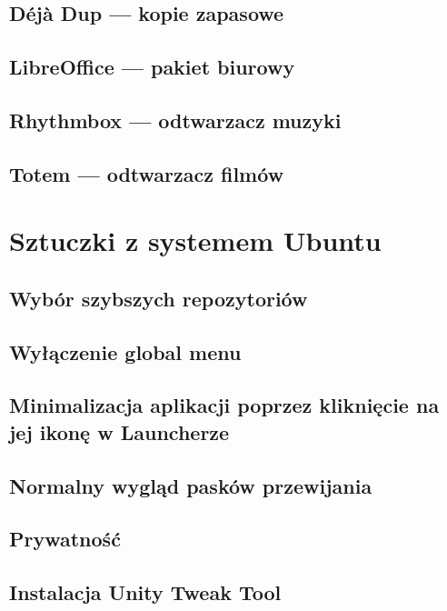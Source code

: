 \documentclass[a4paper,11pt,oneside]{mwart}
\begin{document}
		\subsection{Déjà Dup --- kopie zapasowe}
			
		\subsection{LibreOffice --- pakiet biurowy}
			
		\subsection{Rhythmbox --- odtwarzacz muzyki}
			
		\subsection{Totem --- odtwarzacz filmów}
						
	\section{Sztuczki z systemem Ubuntu}
		
		\subsection{Wybór szybszych repozytoriów}
			
		\subsection{Wyłączenie global menu}
			
		\subsection{Minimalizacja aplikacji poprzez kliknięcie na jej ikonę w Launcherze}
			
		\subsection{Normalny wygląd pasków przewijania}
			
		\subsection{Prywatność}
			
		\subsection{Instalacja Unity Tweak Tool}
			
\end{document}
